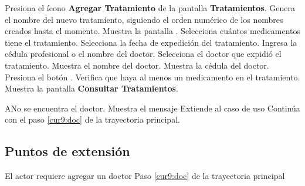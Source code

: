 \begin{UCtrayectoria}
 	
 	\UCpaso [\UCactor] Presiona el ícono \textbf{Agregar Tratamiento} de la pantalla \textbf{Tratamientos}.
 	\UCpaso Genera el nombre del nuevo tratamiento, siguiendo el orden numérico de los nombres creados hasta el momento.
 	\UCpaso Muestra la pantalla .
 	\UCpaso [\UCactor] Selecciona cuántos medicamentos tiene el tratamiento.
 	\UCpaso [\UCactor] Selecciona la fecha de expedición del tratamiento.
 	\UCpaso [\UCactor] Ingresa la cédula profesional o el nombre del doctor.
 	\UCpaso [\UCactor] Selecciona el doctor que expidió el tratamiento.
 	\UCpaso Muestra el nombre del doctor.
 	\UCpaso Muestra la cédula del doctor.
 	\UCpaso [\UCactor] Presiona el botón . \label{cur9:doc}
 	\UCpaso Verifica que haya al menos un medicamento en el tratamiento.
 	\UCpaso Muestra la pantalla \textbf{Consultar Tratamientos}.
 	
 	
    
 \end{UCtrayectoria}

\begin{UCtrayectoriaA}{A}{No se encuentra el doctor.}
	\UCpaso Muestra el mensaje 
	\UCpaso Extiende al caso de uso  
	\UCpaso Continúa con el paso \ref{cur9:doc} de la trayectoria principal.
\end{UCtrayectoriaA} 
 



 
\subsection{Puntos de extensión}

\UCExtensionPoint
{El actor requiere agregar un doctor}
{ Paso \ref{cur9:doc} de la trayectoria principal}
{}



